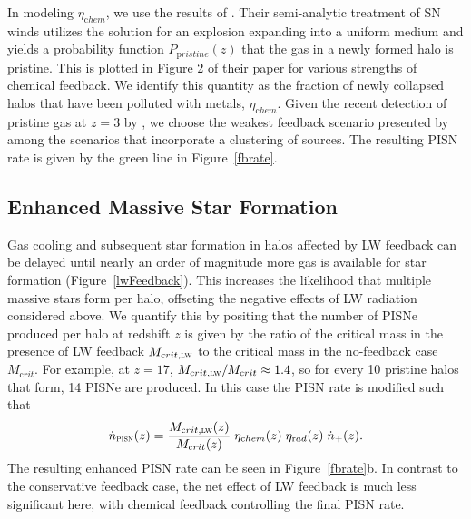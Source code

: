 \documentclass{thesis}
\newcommand{\RefFig}[1]{\mbox{Figure~\ref{#1}}}
\begin{document}
In modeling $\eta_{\mathrm chem}$, we use the results of
\citet{FurlanettoLoeb2005}.  Their semi-analytic treatment of SN winds
utilizes the \citet{Sedov1959} solution for an explosion expanding
into a uniform medium and yields a probability function $P_{\mathrm
  pristine}(z)$ that the gas in a newly formed halo is pristine.  This
is plotted in Figure 2 of their paper for various strengths of
chemical feedback.  We identify this quantity as the fraction of newly
collapsed halos that have been polluted with metals, $\eta_{\mathrm
  chem}$.  Given the recent detection of pristine gas at $z = 3$ by
\citet{FumagalliOMearaProchaska2011}, we choose the weakest feedback
scenario presented by \citet{FurlanettoLoeb2005} among the scenarios
that incorporate a clustering of sources. The resulting PISN rate is
given by the green line in \RefFig{fbrate}.

\subsection{Enhanced Massive Star Formation}
Gas cooling and subsequent star formation in halos affected by LW
feedback can be delayed until nearly an order of magnitude more gas is
available for star formation (\RefFig{lwFeedback}). This increases the
likelihood that multiple massive stars form per halo, offseting the
negative effects of LW radiation considered above.  We quantify this
by positing that the number of PISNe produced per halo at redshift $z$
is given by the ratio of the critical mass in the presence of LW
feedback $M_{\mathrm crit, \textsc{lw}}$ to the critical mass in the
no-feedback case $M_{\mathrm crit}$.  For example, at $z=17$, $M_{\mathrm
  crit, \textsc{lw}} / M_{\mathrm crit} \approx 1.4$, so for every 10
pristine halos that form, 14 PISNe are produced.  In this case the
PISN rate is modified such that
\begin{equation}
\dot{n}_{\textsc{pisn}}(z) = \frac{M_{\mathrm crit, \textsc{lw}}(z)}{M_{\mathrm crit}(z)} \;
\eta_{\mathrm chem}(z) \; \eta_{\mathrm rad}(z) \; \dot{n}_{+}(z).
\label{pisnrate2}
\end{equation}
The resulting enhanced PISN rate can be seen in \RefFig{fbrate}b.  In
contrast to the conservative feedback case, the net effect of LW
feedback is much less significant here, with chemical feedback
controlling the final PISN rate.
\end{document}
